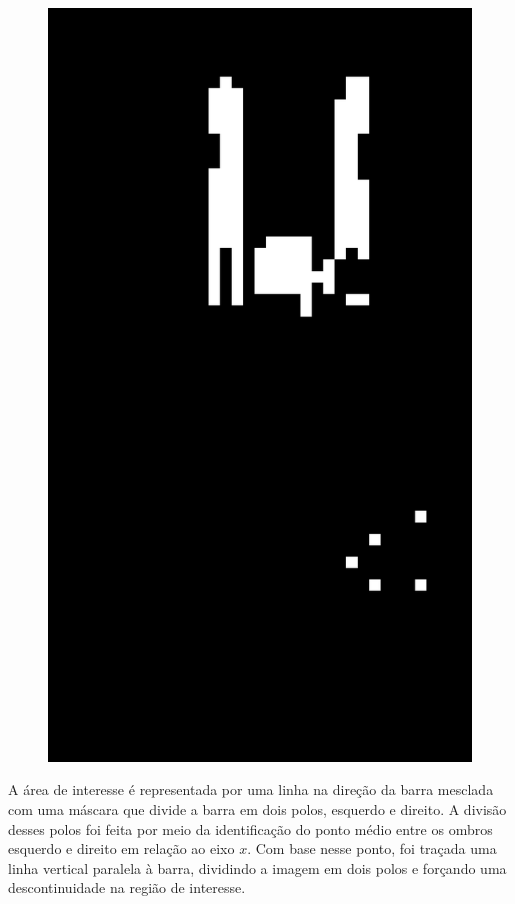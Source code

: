 \begin{figure}[H]
\begin{minipage}{\sizeImg\textwidth}
            \includegraphics[width=\textwidth]{figuras/mao_barra/limited3.png}
        \end{minipage}
    \label{fig:pixeled}
\end{figure}


A área de interesse é representada por uma linha na direção da barra mesclada com uma máscara que divide a barra em dois polos, esquerdo e direito. A divisão desses polos foi feita por meio da identificação do ponto médio entre os ombros esquerdo e direito em relação ao eixo $x$. Com base nesse ponto, foi traçada uma linha vertical paralela à barra, dividindo a imagem em dois polos e forçando uma descontinuidade na região de interesse.

